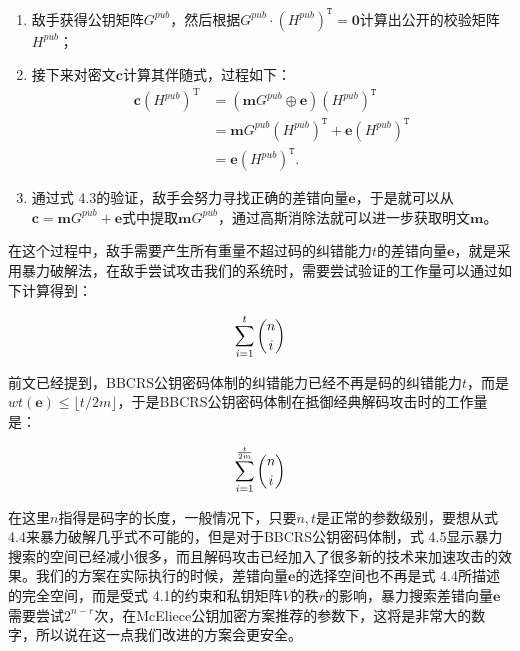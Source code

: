 \begin{enumerate}
	\item 敌手获得公钥矩阵$G^{pub}$，然后根据$G^{pub} \cdot (H^{pub})^\mathtt{T} = \mathbf{0}$计算出公开的校验矩阵$H^{pub}$；
	\item 接下来对密文$\mathbf{c}$计算其伴随式，过程如下：
	\begin{equation}
		\begin{aligned}
			\mathbf{c}(H^{pub})^\mathrm{T} & = (\mathbf{m}G^{pub} \oplus\mathbf{e})(H^{pub})^\mathtt{T} \\
			& = \mathbf{m}G^{pub}(H^{pub})^\mathtt{T} + \mathbf{e}(H^{pub})^\mathtt{T} \\
			& = \mathbf{e}(H^{pub})^\mathtt{T}.
		\end{aligned}
	\end{equation}
	\item 通过式 4.3的验证，敌手会努力寻找正确的差错向量$\mathbf{e}$，于是就可以从$\mathbf{c} = \mathbf{m}G^{pub} + \mathbf{e}$式中提取$\mathbf{m}G^{pub}$，通过高斯消除法就可以进一步获取明文$\mathbf{m}$。		
\end{enumerate}

在这个过程中，敌手需要产生所有重量不超过码的纠错能力$t$的差错向量$\mathbf{e}$，就是采用暴力破解法，在敌手尝试攻击我们的系统时，需要尝试验证的工作量可以通过如下计算得到：

\begin{equation}\label{Eq:numberOfErrorVectionInOriginalAttack}
\sum_{i=1}^{t} \dbinom{n}{i}
\end{equation}

前文已经提到，BBCRS公钥密码体制的纠错能力已经不再是码的纠错能力$t$，而是$wt(\mathbf{e}) \leq \lfloor t/2m \rfloor$，于是BBCRS公钥密码体制在抵御经典解码攻击时的工作量是：

\begin{equation}\label{Eq:numberOfErrorVectionInBBCRSScheme}
\sum_{i=1}^{\frac{t}{2m}} \dbinom{n}{i}
\end{equation}

在这里$n$指得是码字的长度，一般情况下，只要$n,t$是正常的参数级别，要想从式 4.4来暴力破解几乎式不可能的，但是对于BBCRS公钥密码体制，式 4.5显示暴力搜索的空间已经减小很多，而且解码攻击已经加入了很多新的技术来加速攻击的效果。我们的方案在实际执行的时候，差错向量$\mathbf{e}$的选择空间也不再是式 4.4所描述的完全空间，而是受式 4.1的约束和私钥矩阵$V$的秩$r$的影响，暴力搜索差错向量$\mathbf{e}$需要尝试$2^{n-r}$次，在McEliece公钥加密方案推荐的参数下，这将是非常大的数字，所以说在这一点我们改进的方案会更安全。

